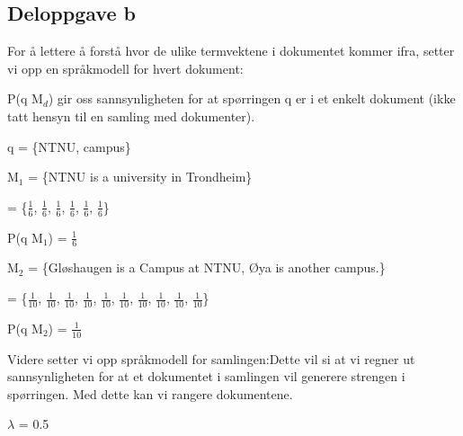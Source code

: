 \documentclass[]{article}
\begin{document}
\subsection*{Deloppgave b}

For å lettere å forstå hvor de ulike termvektene i dokumentet kommer ifra, setter vi opp en språkmodell for hvert dokument:

\noindent P(q \textbar  M$_{d}$) gir oss sannsynligheten for at spørringen q er i et enkelt dokument (ikke tatt hensyn til en samling med dokumenter).

\vspace{2mm}

q = \{NTNU, campus\}

\vspace{2mm}

M$_{1}$ = \{NTNU is a university in Trondheim\}

\vspace{2mm}

\hspace{3.2ex} = \{$\frac{1}{6}$, $\frac{1}{6}$, $\frac{1}{6}$, $\frac{1}{6}$, $\frac{1}{6}$, $\frac{1}{6}$\}

\vspace{2mm}

P(q \textbar  M$_{1}$) = $\frac{1}{6}$

\vspace{5mm}

M$_{2}$ = \{Gløshaugen is a Campus at NTNU, Øya is another campus.\}\footnotemark[1]

\vspace{2mm}

\hspace{3.2ex} = \{$\frac{1}{10}$, $\frac{1}{10}$, $\frac{1}{10}$, $\frac{1}{10}$, $\frac{1}{10}$, $\frac{1}{10}$, $\frac{1}{10}$, $\frac{1}{10}$, $\frac{1}{10}$, $\frac{1}{10}$\}

\vspace{2mm}

P(q \textbar M$_{2}$) = $\frac{1}{10}$

\vspace{5mm}

\noindent Videre setter vi opp språkmodell for samlingen:\footnotemark[2]
\noindent Dette vil si at vi regner ut sannsynligheten for at et dokumentet i samlingen vil generere strengen i spørringen. Med dette kan vi rangere dokumentene.

\vspace{2mm}

$\lambda$ = 0.5
\end{document}
